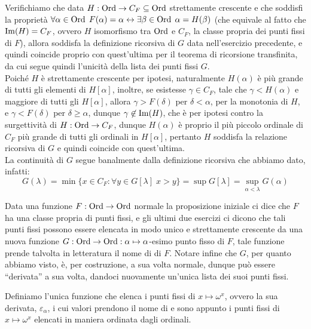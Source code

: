 \begin{soln}
	Verifichiamo che data $H : \operatorname{Ord} \to C_F \subseteq \operatorname{Ord}$ strettamente crescente e che soddisfi la propriet\`a $\forall \alpha \in \operatorname{Ord} \; F(\alpha) = \alpha \leftrightarrow \exists \beta \in \operatorname{Ord} \; \alpha = H(\beta)$ (che equivale al fatto che $\operatorname{Im}(H) = C_F$,
	ovvero $H$ isomorfismo tra $\operatorname{Ord}$ e $C_F$, la classe propria dei punti fissi di $F$), allora soddisfa la definizione ricorsiva di $G$ data nell'esercizio precedente,
	e quindi coincide proprio con quest'ultima per il teorema di ricorsione transfinita, da cui segue quindi l'unicit\`a della lista dei punti fissi $G$.\\
	Poich\'e $H$ \`e strettamente crescente per ipotesi, naturalmente $H(\alpha)$ \`e pi\`u grande di tutti gli elementi di $H[\alpha]$, inoltre,
	se esistesse $\gamma \in C_F$, tale che $\gamma < H(\alpha)$ e maggiore di tutti gli $H[\alpha]$, allora $\gamma > F(\delta)$ per $\delta < \alpha$, per la monotonia di $H$, e $\gamma < F(\delta)$ per $\delta \geq \alpha$, dunque $\gamma \not\in \operatorname{Im}(H)$, che \`e per ipotesi contro la surgettivit\`a di $H : \operatorname{Ord} \to C_F$,
	dunque $H(\alpha)$ \`e proprio il pi\`u piccolo ordinale di $C_F$ pi\`u grande di tutti gli ordinali in $H[\alpha]$, pertanto $H$ soddisfa la relazione ricorsiva di $G$ e quindi coincide con quest'ultima.\\
	La continuit\`a di $G$ segue banalmente dalla definizione ricorsiva che abbiamo dato, infatti:
	\[ G(\lambda) = \min\{x \in C_F : \forall y \in G[\lambda] \; x > y\} = \sup G[\lambda] = \sup_{\alpha < \lambda} G(\alpha)
		\]
\end{soln}

\begin{remark}
	Data una funzione $F : \operatorname{Ord} \to \operatorname{Ord}$ normale la proposizione iniziale ci dice che $F$ ha una classe propria di punti fissi, e gli ultimi due esercizi ci dicono che tali punti fissi possono essere elencata in modo unico e strettamente crescente da una nuova funzione $G : \operatorname{Ord} \to \operatorname{Ord} : \alpha \mapsto \alpha$-esimo punto fisso di $F$,
	tale funzione prende talvolta in letteratura il nome di  di $F$. Notare infine che $G$, per quanto abbiamo visto, \`e, per costruzione, a sua volta normale, dunque pu\`o essere ``derivata'' a sua volta, dandoci nuovamente un'unica lista dei suoi punti fissi.
\end{remark}

\begin{definition}
	Definiamo l'unica funzione che elenca i punti fissi di $x \mapsto \omega^x$, ovvero la sua derivata, $\varepsilon_\alpha$, i cui valori prendono il nome di  e sono appunto i punti fissi di $x \mapsto \omega^x$ elencati in maniera ordinata dagli ordinali.
\end{definition}

